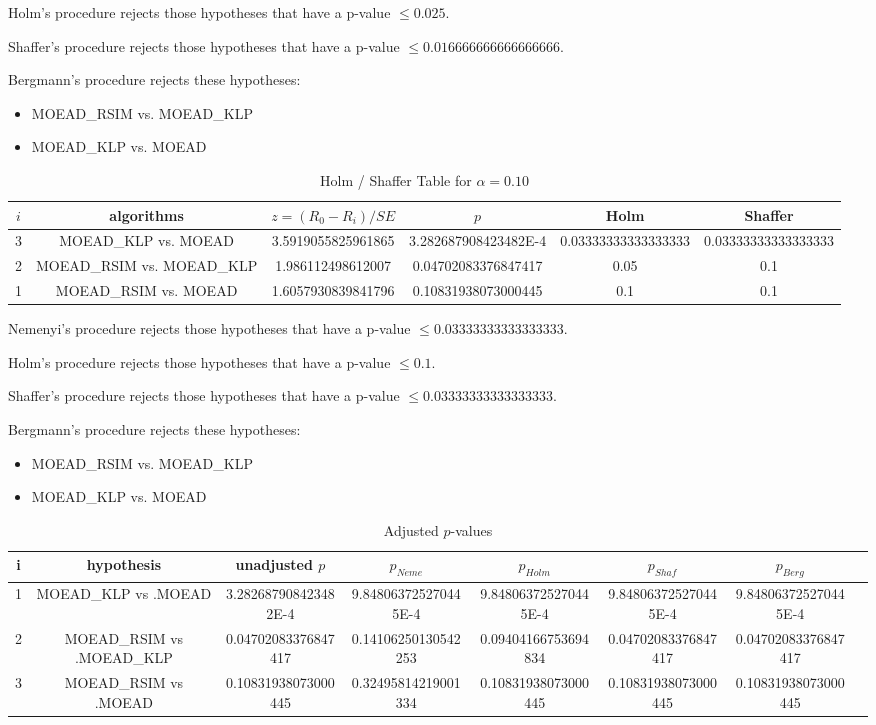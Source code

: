 \documentclass[a4paper,10pt]{article}
\begin{document}
\begin{landscape}
Holm's procedure rejects those hypotheses that have a p-value $\le0.025$.


Shaffer's procedure rejects those hypotheses that have a p-value $\le0.016666666666666666$.


Bergmann's procedure rejects these hypotheses:


\begin{itemize}


\item MOEAD_RSIM vs. MOEAD_KLP
\item MOEAD_KLP vs. MOEAD
\end{itemize}


\begin{table}[!htp]
\centering\tiny
\caption{Holm / Shaffer Table for $\alpha=0.10$}
\begin{tabular}{cccccc}
$i$&algorithms&$z=(R_0 - R_i)/SE$&$p$&Holm&Shaffer\\
\hline
3&MOEAD_KLP vs. MOEAD&3.5919055825961865&3.282687908423482E-4&0.03333333333333333&0.03333333333333333\\
2&MOEAD_RSIM vs. MOEAD_KLP&1.986112498612007&0.04702083376847417&0.05&0.1\\
1&MOEAD_RSIM vs. MOEAD&1.6057930839841796&0.10831938073000445&0.1&0.1\\
\hline
\end{tabular}
\end{table}
Nemenyi's procedure rejects those hypotheses that have a p-value $\le0.03333333333333333$.


Holm's procedure rejects those hypotheses that have a p-value $\le0.1$.


Shaffer's procedure rejects those hypotheses that have a p-value $\le0.03333333333333333$.


Bergmann's procedure rejects these hypotheses:


\begin{itemize}


\item MOEAD_RSIM vs. MOEAD_KLP
\item MOEAD_KLP vs. MOEAD
\end{itemize}


\begin{table}[!htp]
\centering\tiny
\caption{Adjusted $p$-values}
\begin{tabular}{cccccccc}
i&hypothesis&unadjusted $p$&$p_{Neme}$&$p_{Holm}$&$p_{Shaf}$&$p_{Berg}$\\
\hline
1&MOEAD_KLP vs .MOEAD&3.282687908423482E-4&9.848063725270445E-4&9.848063725270445E-4&9.848063725270445E-4&9.848063725270445E-4\\
2&MOEAD_RSIM vs .MOEAD_KLP&0.04702083376847417&0.14106250130542253&0.09404166753694834&0.04702083376847417&0.04702083376847417\\
3&MOEAD_RSIM vs .MOEAD&0.10831938073000445&0.32495814219001334&0.10831938073000445&0.10831938073000445&0.10831938073000445\\
\hline
\end{tabular}
\end{table}

\end{landscape}
\end{document}
